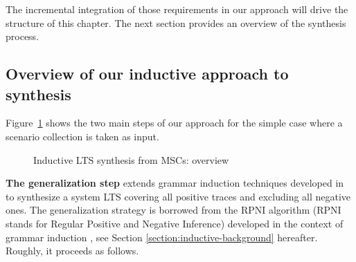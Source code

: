 The incremental integration of those requirements in our approach will drive the structure of this chapter. The next section provides an overview of the synthesis process.


\subsection{Overview of our inductive approach to synthesis\label{subsection:inductive-synthesis-approach}}

Figure~\ref{image:inductive-synthesis-overview} shows the two main steps of our approach for the simple case where a scenario collection is taken as input. 

\begin{figure}[h]
\centering
{}
\caption{Inductive LTS synthesis from MSCs: overview\label{image:inductive-synthesis-overview}}
\end{figure}

\noindent \textbf{The generalization step} extends grammar induction techniques developed in \cite{Oncina:1992} to synthesize a system LTS covering all positive traces and excluding all negative ones. The generalization strategy is borrowed from the RPNI algorithm (RPNI stands for Regular Positive and Negative Inference) developed in the context of grammar induction \cite{Oncina:1992}, see Section \ref{section:inductive-background} hereafter. Roughly, it proceeds as follows.

